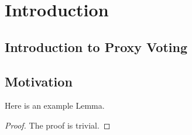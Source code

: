 \section{Introduction}

\subsection{Introduction to Proxy Voting}

\subsection{Motivation}

\begin{lemma}
Here is an example Lemma.
\end{lemma}
\begin{proof}
The proof is trivial.
\end{proof}
\cite{test}